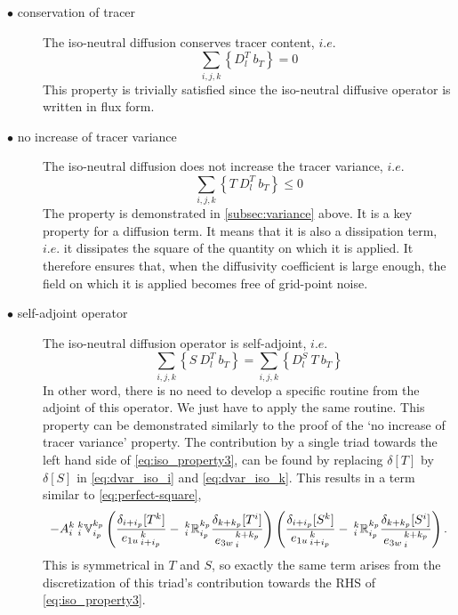 \documentclass[../tex_main/NEMO_manual]{subfiles}
\begin{document}
\begin{description}
\item[$\bullet$ conservation of tracer] The iso-neutral diffusion
  conserves tracer content, $i.e.$
  \begin{equation} \label{eq:iso_property1} \sum_{i,j,k} \left\{ D_l^T \
      b_T \right\} = 0
  \end{equation}
  This property is trivially satisfied since the iso-neutral diffusive
  operator is written in flux form.

\item[$\bullet$ no increase of tracer variance] The iso-neutral diffusion
  does not increase the tracer variance, $i.e.$
  \begin{equation} \label{eq:iso_property2} \sum_{i,j,k} \left\{ T \ D_l^T
      \ b_T \right\} \leq 0
  \end{equation}
  The property is demonstrated in
  \autoref{subsec:variance} above. It is a key property for a diffusion
  term. It means that it is also a dissipation term, $i.e.$ it
  dissipates the square of the quantity on which it is applied.  It
  therefore ensures that, when the diffusivity coefficient is large
  enough, the field on which it is applied becomes free of grid-point
  noise.

\item[$\bullet$ self-adjoint operator] The iso-neutral diffusion
  operator is self-adjoint, $i.e.$
  \begin{equation} \label{eq:iso_property3} \sum_{i,j,k} \left\{ S \ D_l^T
      \ b_T \right\} = \sum_{i,j,k} \left\{ D_l^S \ T \ b_T \right\}
  \end{equation}
  In other word, there is no need to develop a specific routine from
  the adjoint of this operator. We just have to apply the same
  routine. This property can be demonstrated similarly to the proof of
  the `no increase of tracer variance' property. The contribution by a
  single triad towards the left hand side of \autoref{eq:iso_property3}, can
  be found by replacing $\delta[T]$ by $\delta[S]$ in \autoref{eq:dvar_iso_i}
  and \autoref{eq:dvar_iso_k}. This results in a term similar to
  \autoref{eq:perfect-square},
\begin{equation}
  \label{eq:TScovar}
  - {A}_i^k{\:} _i^k\mathbb{V}_{i_p}^{k_p}
  \left(
    \frac{ \delta_{i+ i_p}[T^k] }{ {e_{1u}}_{\,i + i_p}^{\,k} }
    -{\:}_i^k\mathbb{R}_{i_p}^{k_p}
    \frac{ \delta_{k+k_p} [T^i] }{{e_{3w}}_{\,i}^{\,k+k_p} }
  \right)
  \left(
    \frac{ \delta_{i+ i_p}[S^k] }{ {e_{1u}}_{\,i + i_p}^{\,k} }
    -{\:}_i^k\mathbb{R}_{i_p}^{k_p}
    \frac{ \delta_{k+k_p} [S^i] }{{e_{3w}}_{\,i}^{\,k+k_p} }
  \right).
\end{equation}
This is symmetrical in $T $ and $S$, so exactly the same term arises
from the discretization of this triad's contribution towards the
RHS of \autoref{eq:iso_property3}.
\end{description}
\end{document}
